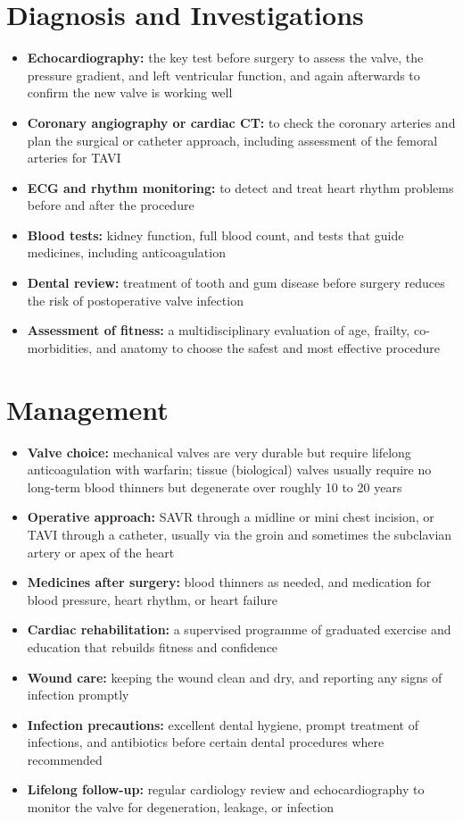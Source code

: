 \section*{Diagnosis and Investigations}
\begin{itemize}
    \item \textbf{Echocardiography:} the key test before surgery to assess the valve, the pressure gradient, and left ventricular function, and again afterwards to confirm the new valve is working well
    \item \textbf{Coronary angiography or cardiac CT:} to check the coronary arteries and plan the surgical or catheter approach, including assessment of the femoral arteries for TAVI
    \item \textbf{ECG and rhythm monitoring:} to detect and treat heart rhythm problems before and after the procedure
    \item \textbf{Blood tests:} kidney function, full blood count, and tests that guide medicines, including anticoagulation
    \item \textbf{Dental review:} treatment of tooth and gum disease before surgery reduces the risk of postoperative valve infection
    \item \textbf{Assessment of fitness:} a multidisciplinary evaluation of age, frailty, co-morbidities, and anatomy to choose the safest and most effective procedure
\end{itemize}

\section*{Management}
\begin{itemize}
    \item \textbf{Valve choice:} mechanical valves are very durable but require lifelong anticoagulation with warfarin; tissue (biological) valves usually require no long-term blood thinners but degenerate over roughly 10 to 20 years
    \item \textbf{Operative approach:} SAVR through a midline or mini chest incision, or TAVI through a catheter, usually via the groin and sometimes the subclavian artery or apex of the heart
    \item \textbf{Medicines after surgery:} blood thinners as needed, and medication for blood pressure, heart rhythm, or heart failure
    \item \textbf{Cardiac rehabilitation:} a supervised programme of graduated exercise and education that rebuilds fitness and confidence
    \item \textbf{Wound care:} keeping the wound clean and dry, and reporting any signs of infection promptly
    \item \textbf{Infection precautions:} excellent dental hygiene, prompt treatment of infections, and antibiotics before certain dental procedures where recommended
    \item \textbf{Lifelong follow-up:} regular cardiology review and echocardiography to monitor the valve for degeneration, leakage, or infection
\end{itemize}

